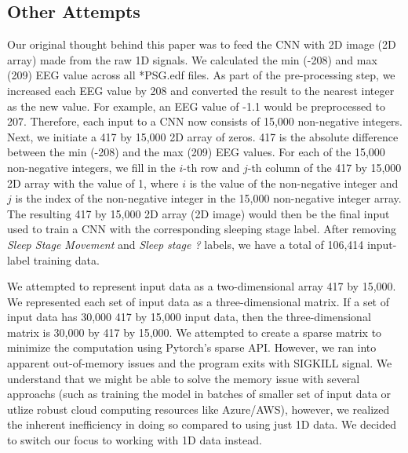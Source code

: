 \documentclass{amia}
\begin{document}
\subsection*{Other Attempts}

Our original thought behind this paper was to feed the CNN with 2D image (2D array) made from the raw 1D signals. We calculated the min (-208) and max (209) EEG value across all *PSG.edf files. As part of the pre-processing step, we increased each EEG value by 208 and converted the result to the nearest integer as the new value. For example, an EEG value of -1.1 would be preprocessed to 207. Therefore, each input to a CNN now consists of 15,000 non-negative integers. Next, we initiate a 417 by 15,000 2D array of zeros. 417 is the absolute difference between the min (-208) and the max (209) EEG values. For each of the 15,000 non-negative integers, we fill in the $i$-th row and $j$-th column of the 417 by 15,000 2D array with the value of 1, where $i$ is the value of the non-negative integer and $j$ is the index of the non-negative integer in the 15,000 non-negative integer array. The resulting 417 by 15,000 2D array (2D image) would then be the final input used to train a CNN with the corresponding sleeping stage label. After removing \textit{Sleep Stage Movement} and \textit{Sleep stage ?} labels, we have a total of 106,414 input-label training data.

We attempted to represent input data as a two-dimensional array 417 by 15,000. We represented each set of input data as a three-dimensional matrix. If a set of input data has 30,000 417 by 15,000 input data, then the three-dimensional matrix is 30,000 by 417 by 15,000. We attempted to create a sparse matrix to minimize the computation using Pytorch’s sparse API. However, we ran into apparent out-of-memory issues and the program exits with SIGKILL signal. We understand that we might be able to solve the memory issue with several approachs (such as training the model in batches of smaller set of input data or utlize robust cloud computing resources like Azure/AWS), however, we realized the inherent inefficiency in doing so compared to using just 1D data. We decided to switch our focus to working with 1D data instead. 
\end{document}
